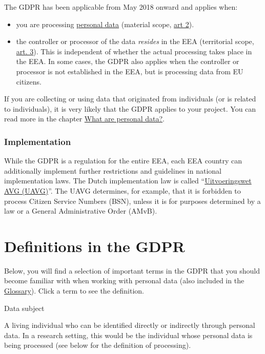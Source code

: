 \documentclass[
]{book}
\providecommand{\tightlist}{%
  \setlength{\itemsep}{0pt}\setlength{\parskip}{0pt}}
\begin{document}
The GDPR has been applicable from May 2018 onward and applies when:

\begin{itemize}
\tightlist
\item
  you are processing \protect\hyperlink{personal-data}{personal data}
  (material scope, \href{https://gdpr-info.eu/art-2-gdpr/}{art 2}).
\item
  the controller or processor of the data \emph{resides} in the EEA (territorial
  scope, \href{https://gdpr-info.eu/art-3-gdpr/}{art. 3}).
  This is independent of whether the actual processing takes place in the EEA.
  In some cases, the GDPR also applies when the controller or processor is not
  established in the EEA, but is processing data from EU citizens.
\end{itemize}

If you are collecting or using data that originated from individuals (or is
related to individuals), it is very likely that the GDPR applies to your project.
You can read more in the chapter \protect\hyperlink{personal-data}{What are personal data?}.

\hypertarget{implementation}{%
\subsubsection{Implementation}\label{implementation}}

While the GDPR is a regulation for the entire EEA, each EEA country can additionally
implement further restrictions and guidelines in national implementation laws. The
Dutch implementation law is called
``\href{https://wetten.overheid.nl/BWBR0040940/2021-07-01\%22}{Uitvoeringswet AVG (UAVG)}''.
The UAVG determines, for example, that it is forbidden to process Citizen
Service Numbers (BSN), unless it is for purposes determined by a law or a
General Administrative Order (AMvB).

\hypertarget{definitions}{%
\section{Definitions in the GDPR}\label{definitions}}

Below, you will find a selection of important terms in the GDPR that you should
become familiar with when working with personal data (also included in the
\protect\hyperlink{glossary}{Glossary}). Click a term to see the definition.

Data subject

A living individual who can be identified directly or indirectly through
personal data. In a research setting, this would be the individual whose
personal data is being processed (see below for the definition of processing).
\end{document}
